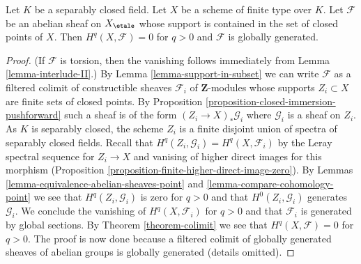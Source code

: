 \begin{lemma}
\label{lemma-supported-in-closed-points}
Let $K$ be a separably closed field. Let $X$ be a scheme of finite
type over $K$. Let $\mathcal{F}$ be an abelian sheaf on $X_\etale$
whose support is contained in the set of closed points of $X$.
Then $H^q(X, \mathcal{F}) = 0$ for $q > 0$ and $\mathcal{F}$
is globally generated.
\end{lemma}

\begin{proof}
(If $\mathcal{F}$ is torsion, then the vanishing follows immediately
from Lemma \ref{lemma-interlude-II}.)
By Lemma \ref{lemma-support-in-subset} we can write $\mathcal{F}$
as a filtered colimit of constructible sheaves $\mathcal{F}_i$
of $\mathbf{Z}$-modules whose supports $Z_i \subset X$ are finite
sets of closed points. By
Proposition \ref{proposition-closed-immersion-pushforward}
such a sheaf is of the form $(Z_i \to X)_*\mathcal{G}_i$
where $\mathcal{G}_i$ is a sheaf on $Z_i$. As $K$ is separably closed,
the scheme $Z_i$ is a finite disjoint union of spectra of separably closed
fields. Recall that $H^q(Z_i, \mathcal{G}_i) = H^q(X, \mathcal{F}_i)$
by the Leray spectral sequence for $Z_i \to X$ and vanising of higher
direct images for this morphism
(Proposition \ref{proposition-finite-higher-direct-image-zero}).
By Lemmas \ref{lemma-equivalence-abelian-sheaves-point} and
\ref{lemma-compare-cohomology-point}
we see that $H^q(Z_i, \mathcal{G}_i)$ is zero for $q > 0$
and that $H^0(Z_i, \mathcal{G}_i)$ generates $\mathcal{G}_i$.
We conclude the vanishing of $H^q(X, \mathcal{F}_i)$ for $q > 0$
and that $\mathcal{F}_i$ is generated by global sections.
By Theorem \ref{theorem-colimit} we see that
$H^q(X, \mathcal{F}) = 0$ for $q > 0$.
The proof is now done because a
filtered colimit of globally generated sheaves of abelian groups
is globally generated (details omitted).
\end{proof}
